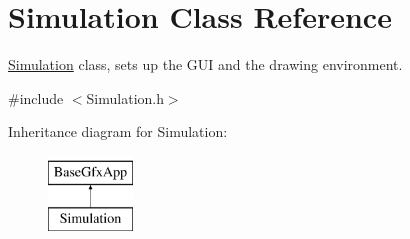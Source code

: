 \hypertarget{classSimulation}{\section{Simulation Class Reference}
\label{classSimulation}
}


\hyperlink{classSimulation}{Simulation} class, sets up the G\-U\-I and the drawing environment.  




{\ttfamily \#include $<$Simulation.\-h$>$}

Inheritance diagram for Simulation\-:\begin{figure}[H]
\begin{center}
\leavevmode
\includegraphics[height=2.000000cm]{classSimulation}
\end{center}
\end{figure}

